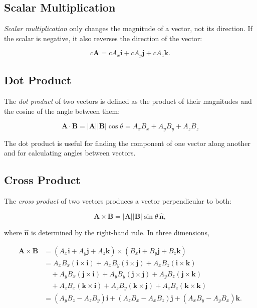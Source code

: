 \documentclass[../main.tex]{subfiles}
\begin{document}
\subsection{Scalar Multiplication}

\emph{Scalar multiplication} only changes the magnitude of a vector, not its direction. If the scalar is negative, it also reverses the direction of the vector:

\[
c\mathbf{A} = cA_x\mathbf{i} + cA_y\mathbf{j} + cA_z\mathbf{k}.
\]



\subsection{Dot Product}

The \emph{dot product} of two vectors is defined as the product of their magnitudes and the cosine of the angle between them:

\[\mathbf{A}\cdot\mathbf{B} = |\mathbf{A}||\mathbf{B}|\cos\theta = {A_x}B_x + A_y{B_y} + {A_z}{B_z}\]

The dot product is useful for finding the component of one vector along another and for calculating angles between vectors.



\subsection{Cross Product}


The \emph{cross product} of two vectors produces a vector perpendicular to both:

\[
\mathbf{A}\times\mathbf{B}
= |\mathbf{A}||\mathbf{B}|\sin\theta\,\hat{\mathbf{n}},
\]

where $\hat{\mathbf{n}}$ is determined by the right-hand rule. In three dimensions,

\begin{align*}
	\mathbf{A}\times\mathbf{B}
		&= (A_x\mathbf{i} + A_y\mathbf{j} + A_z\mathbf{k}) \times (B_x\mathbf{i} + B_y\mathbf{j} + B_z\mathbf{k})\\
		&= {A_x}B_x(\mathbf{i}\times\mathbf{i}) + {A_x}B_y(\mathbf{i}\times\mathbf{j}) + {A_x}B_z(\mathbf{i}\times\mathbf{k}) \\
		&\quad + {A_y}B_x(\mathbf{j}\times\mathbf{i}) + {A_y}B_y(\mathbf{j}\times\mathbf{j}) + {A_y}B_z(\mathbf{j}\times\mathbf{k}) \\
		&\quad + {A_z}B_x(\mathbf{k}\times\mathbf{i}) + {A_z}B_y(\mathbf{k}\times\mathbf{j}) + {A_z}B_z(\mathbf{k}\times\mathbf{k}) \\
		&= ({A_y}B_z - {A_z}B_y)\mathbf{i} + ({A_z}B_x - {A_x}B_z)\mathbf{j} + ({A_x}B_y - {A_y}B_x)\mathbf{k}.  
\end{align*}
\end{document}
